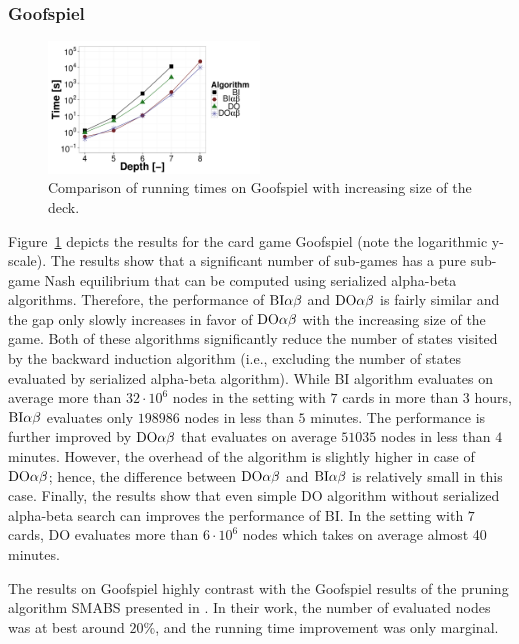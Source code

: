 \subsubsection{Goofspiel}
\begin{figure}
\centering
\includegraphics[width=0.5\textwidth]{figures/GS.pdf}
\caption{Comparison of running times on Goofspiel with increasing size of the deck.} \label{fig:off:res:gs}
\end{figure}

Figure~\ref{fig:off:res:gs} depicts the results for the card game Goofspiel (note the logarithmic y-scale).
The results show that a significant number of sub-games has a pure sub-game Nash equilibrium that can be computed using serialized alpha-beta algorithms.
Therefore, the performance of $\textrm{BI}\alpha\beta$ and $\textrm{DO}\alpha\beta$ is fairly similar and the gap only slowly increases in favor of $\textrm{DO}\alpha\beta$ with the increasing size of the game.
Both of these algorithms significantly reduce the number of states visited by the backward induction algorithm (i.e., excluding the number of states evaluated by serialized alpha-beta algorithm).
While \textsc{BI} algorithm evaluates on average more than $32\cdot10^6$ nodes in the setting with $7$ cards in more than $3$ hours, $\textrm{BI}\alpha\beta$ evaluates only $198986$ nodes in less than $5$ minutes. 
The performance is further improved by $\textrm{DO}\alpha\beta$ that evaluates on average $51035$ nodes in less than $4$ minutes.
However, the overhead of the algorithm is slightly higher in case of $\textrm{DO}\alpha\beta$; hence, the difference between $\textrm{DO}\alpha\beta$ and $\textrm{BI}\alpha\beta$ is relatively small in this case.
Finally, the results show that even simple \textsc{DO} algorithm without serialized alpha-beta search can improves the performance of \textsc{BI}.
In the setting with $7$ cards, \textsc{DO} evaluates more than $6\cdot10^6$ nodes which takes on average almost 40 minutes.

The results on Goofspiel highly contrast with the Goofspiel results of the pruning algorithm SMABS presented in \cite{Saffidine12SMAB}.
In their work, the number of evaluated nodes was at best around $20\%$, and the running time improvement was only marginal. 

